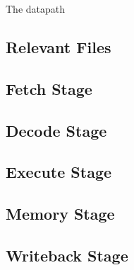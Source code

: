 \label{sec:dp}
The datapath

\subsection{Relevant Files}

\subsection{Fetch Stage}

\subsection{Decode Stage}

\subsection{Execute Stage}

\subsection{Memory Stage}

\subsection{Writeback Stage}